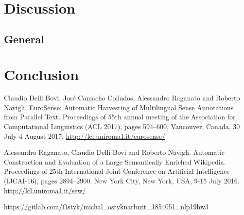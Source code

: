 \documentclass[12pt,a4paper]{article}
\begin{document}
\section{Discussion}

\subsection{General}


\section{Conclusion}

\begin{thebibliography}{1}

 Claudio Delli Bovi, José Camacho Collados, Alessandro Raganato and Roberto Navigli.
EuroSense: Automatic Harvesting of Multilingual Sense Annotations from Parallel Text. Proceedings of 55th annual meeting of the Association for Computational Linguistics (ACL 2017), pages 594–600, Vancouver, Canada, 30 July-4 August 2017. \url{http://lcl.uniroma1.it/eurosense/}

 Alessandro Raganato, Claudio Delli Bovi and Roberto Navigli.
Automatic Construction and Evaluation of a Large Semantically Enriched Wikipedia. Proceedings of 25th International Joint Conference on Artificial Intelligence (IJCAI-16), pages 2894–2900, New York City, New York, USA, 9-15 July 2016. \url{http://lcl.uniroma1.it/sew/}

 \url{https://gitlab.com/Ostyk/michal_ostyknarbutt_1854051_nlp19hw3}
\end{thebibliography}
\end{document}
